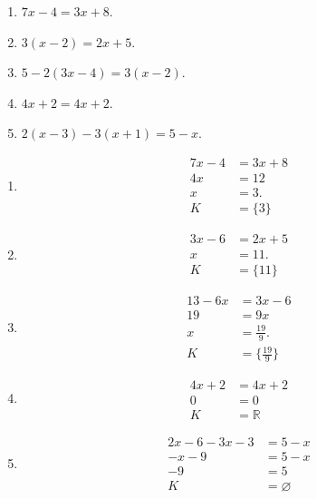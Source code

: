 \documentclass[11pt,a4paper]{article}
\begin{document}
\begin{zadaniReseniBox}[title={Domácí úkol}]
\begin{enumerate}[label=\alph*)]
\item
$7x-4=3x+8$.
\item
$3(x-2)=2x+5$.
\item
$5-2(3x-4)=3(x-2)$.
\item
$4x+2=4x+2$.
\item
$2(x-3)-3(x+1)=5-x$.
\end{enumerate}
\tcblower
\begin{enumerate}[label=\alph*)]
\item
\[
\begin{aligned}7x-4&=3x+8\\4x&=12\\x&=3. \\[2mm]
K &= \{3\}
\end{aligned}
\]
\item
\[
\begin{aligned}3x-6&=2x+5\\x&=11. \\[2mm]
K &= \{11\}
\end{aligned}
\]
\item
\[
\begin{aligned}13-6x&=3x-6\\19&=9x\\x&=\tfrac{19}{9}. \\[2mm]
K &= \{\tfrac{19}{9}\}
\end{aligned}
\]
\item
\[
\begin{aligned}4x+2&=4x+2\\0&=0 \\[2mm]
K &= \mathbb R
\end{aligned}
\]
\item
\[
\begin{aligned}2x-6-3x-3&=5-x\\-x-9&=5-x\\-9&=5 \\[2mm]
K &= \varnothing
\end{aligned}
\]
\end{enumerate}
\end{zadaniReseniBox}
\end{document}
